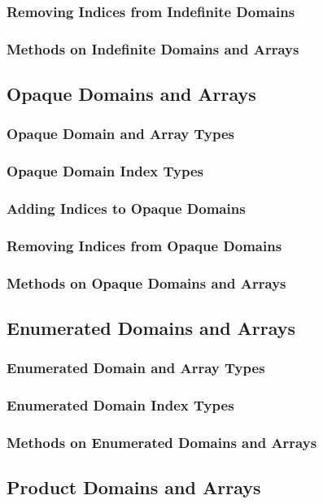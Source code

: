 \documentclass[10pt,twoside,titlepage]{article}
\begin{document}
\subsubsection{Removing Indices from Indefinite Domains}
\subsubsection{Methods on Indefinite Domains and Arrays}
\subsection{Opaque Domains and Arrays}
\subsubsection{Opaque Domain and Array Types}
\subsubsection{Opaque Domain Index Types}
\subsubsection{Adding Indices to Opaque Domains}
\subsubsection{Removing Indices from Opaque Domains}
\subsubsection{Methods on Opaque Domains and Arrays}
\subsection{Enumerated Domains and Arrays}
\subsubsection{Enumerated Domain and Array Types}
\subsubsection{Enumerated Domain Index Types}
\subsubsection{Methods on Enumerated Domains and Arrays}
\subsection{Product Domains and Arrays}
\end{document}
